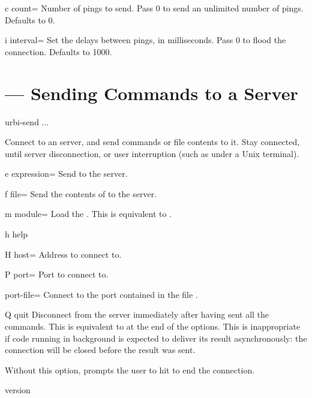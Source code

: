 \begin{options}[Tuning]
\item[c]{count=} Number of pings to send.  Pass 0 to send an
  unlimited number of pings.  Defaults to 0.
\item[i]{interval=} Set the delays between pings, in
  milliseconds.  Pass 0 to flood the connection.  Defaults to 1000.
\end{options}

\section{ --- Sending \us Commands to a Server}
\label{sec:tools:urbi-send}

\begin{shell}
urbi-send ...
\end{shell}

Connect to an \urbi server, and send commands or file contents to it.
Stay connected, until server disconnection, or user interruption (such
as  under a Unix terminal).

\begin{options}
\item[e]{expression=} Send  to the server.
\item[f]{file=} Send the contents of  to the
  server.
\item[m]{module=} Load the \UObject {}.  This is
  equivalent to .
\item[h]{help} \optionHelp
\item[H]{host=} Address to connect to.
\item[P]{port=} Port to connect to.
\item{port-file=} Connect to the port contained in the file
  .
\item[Q]{quit} Disconnect from the server immediately after having sent all
  the commands.  This is equivalent to  at the end of the
  options.  This is inappropriate if code running in background is expected
  to deliver its result asynchronously: the connection will be closed before
  the result was sent.

  Without this option,  prompts the user to hit
   to end the connection.
\item{version} \optionVersion
\end{options}


